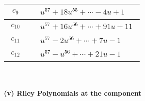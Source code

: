 \documentclass[1p]{elsarticle_modified}
\theoremstyle{definition}
\begin{document}
\begin{tabular}{m{50pt}|m{274pt}}
\hline $$\begin{aligned}c_{9}\end{aligned}$$&$\begin{aligned}
&u^{57}+18 u^{55}+\cdots-4 u+1
\end{aligned}$\\
\hline $$\begin{aligned}c_{10}\end{aligned}$$&$\begin{aligned}
&u^{57}+16 u^{56}+\cdots+91 u+11
\end{aligned}$\\
\hline $$\begin{aligned}c_{11}\end{aligned}$$&$\begin{aligned}
&u^{57}-2 u^{56}+\cdots+7 u-1
\end{aligned}$\\
\hline $$\begin{aligned}c_{12}\end{aligned}$$&$\begin{aligned}
&u^{57}- u^{56}+\cdots+21 u-1
\end{aligned}$\\
\hline
\end{tabular}\\~\\
\newpage\renewcommand{\arraystretch}{1}
\flushleft \textbf{(v) Riley Polynomials at the component}\newline \\
\end{document}
